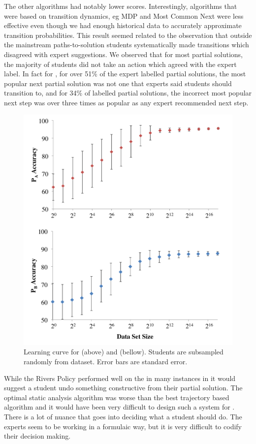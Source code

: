 The other algorithms had notably lower scores. Interestingly, algorithms that were based on transition dynamics, eg MDP and Most Common Next were less effective even though we  had enough historical data to accurately approximate transition probabilities. This result seemed related to the observation that outside the mainstream paths-to-solution students systematically made transitions which disagreed with expert suggestions. We observed that for most partial solutions, the majority of students did not take an action which agreed with the expert label. In fact for \Pa\hspace{-0.5mm}, for over 51\% of the expert labelled partial solutions, the most popular next partial solution was not one that experts said students should transition to, and for 34\% of labelled partial solutions, the incorrect most popular next step was over three times as popular as any expert recommended next step. 


\begin{figure}
\centering
\includegraphics[width=0.5\columnwidth]{img/lcs}
\caption{Learning curve for \Pa (above) and \Pb (bellow). Students are subsampled randomly from dataset. Error bars are standard error.}
\label{fig:learningCurve}
\end{figure}


While the Rivers Policy performed well on the \Pb in many instances in \Pa it would suggest a student undo something constructive from their partial solution. The optimal static analysis algorithm was worse than the best trajectory based algorithm and it would have been very difficult to design such a system for \Pb\hspace{-0.5mm}. There is a lot of nuance that goes into deciding what a student should do. The experts seem to be working in a formulaic way, but it is very difficult to codify their decision making. 

